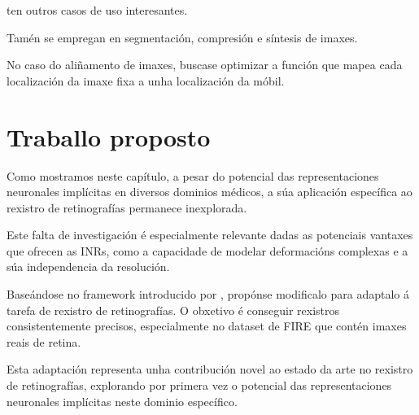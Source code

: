 \cite{velikova2024implicitneuralrepresentationsbreathingcompensated} ten outros casos de uso interesantes.

Tamén se empregan en segmentación, compresión e síntesis de imaxes.

No caso do aliñamento de imaxes, buscase optimizar a función que mapea cada localización da imaxe fixa a unha localización da móbil.

\section{Traballo proposto}
\label{sec:Traballo proposto}

Como mostramos neste capítulo, a pesar do potencial das representaciones neuronales implícitas en diversos dominios médicos, a súa aplicación específica ao rexistro de retinografías permanece inexplorada.

Este falta de investigación é especialmente relevante dadas as potenciais vantaxes que ofrecen as INRs, como a capacidade de modelar deformacións complexas e a súa independencia da resolución.

Baseándose no framework introducido por \cite{wolterink2021implicit}, propónse modificalo para adaptalo á tarefa de rexistro de retinografías. O obxetivo é conseguir rexistros consistentemente precisos, especialmente no dataset de FIRE que contén imaxes reais de retina.

Esta adaptación representa unha contribución novel ao estado da arte no rexistro de retinografías, explorando por primera vez o potencial das representaciones neuronales implícitas neste dominio específico.
